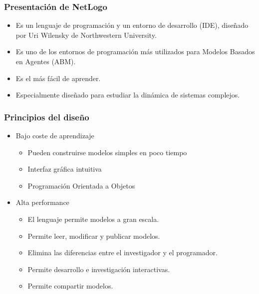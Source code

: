 \documentclass[11pt]{beamer}
\begin{document}
\begin{frame}
\frametitle{Presentación de NetLogo}
\begin{itemize}
	\item Es un lenguaje de programación y un entorno de desarrollo (IDE), diseñado por Uri Wilensky de Northwestern University.
	\item Es uno de los entornos de programación más utilizados para Modelos Basados en Agentes (ABM).
	\item Es el más fácil de aprender.
	\item Especialmente diseñado para estudiar la dinámica de sistemas complejos.
\end{itemize}
\end{frame}

\begin{frame}
\frametitle{Principios del diseño}
\begin{itemize}
	\item Bajo coste de aprendizaje
	\begin{itemize}
		\item Pueden construirse modelos simples en poco tiempo
		\item Interfaz gráfica intuitiva
		\item Programación Orientada a Objetos
	\end{itemize}
	\item Alta performance
	\begin{itemize}
		\item El lenguaje permite modelos a gran escala. 
		\item Permite leer, modificar y publicar modelos.
		\item Elimina las diferencias entre el investigador y el programador.
		\item Permite desarrollo e investigación interactivas.
		\item Permite compartir modelos.
	\end{itemize}
\end{itemize}
\end{frame}
\end{document}
